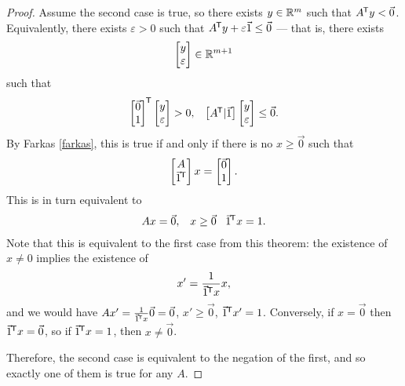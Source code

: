 \begin{proof}
    Assume the second case is true, so there exists $y \in \mathbb{R}^m$ such that ${A}^{\mkern-1.5mu\mathsf{T}}y < \vec{0}$. Equivalently, there exists $\varepsilon > 0$ such that ${A}^{\mkern-1.5mu\mathsf{T}}y + \varepsilon\vec{1} \leq \vec{0}$ --- that is, there exists
    \begin{align*}
        \begin{bmatrix}
            y \\ \varepsilon
        \end{bmatrix} \in \mathbb{R}^{m+1}
    \end{align*}
    such that
    \begin{align*}
        {\begin{bmatrix}
            \vec{0} \\ 1
        \end{bmatrix}}^{\mkern-1.5mu\mathsf{T}}
        \begin{bmatrix}
            y \\ \varepsilon
        \end{bmatrix} > 0,\;\;\;\begin{bmatrix}
            {A}^{\mkern-1.5mu\mathsf{T}} | \vec{1}
        \end{bmatrix}\begin{bmatrix}
            y \\ \varepsilon
        \end{bmatrix} \leq \vec{0}.
    \end{align*}
    By Farkas \ref{farkas}, this is true if and only if there is no $x \geq \vec{0}$ such that
    \begin{align*}
        \begin{bmatrix}
            A \\ {\vec{1}}^{\mkern-1.5mu\mathsf{T}}
        \end{bmatrix}x = \begin{bmatrix}
            \vec{0} \\ 1
        \end{bmatrix}.
    \end{align*}
    This is in turn equivalent to
    \begin{align*}
        Ax = \vec{0},\;\;\;x \geq \vec{0}\;\;\;{\vec{1}}^{\mkern-1.5mu\mathsf{T}}x = 1.
    \end{align*}
    Note that this is equivalent to the first case from this theorem: the existence of $x \neq 0$ implies the existence of
    \begin{align*}
        x' = \frac{1}{{\vec{1}}^{\mkern-1.5mu\mathsf{T}}x}x,
    \end{align*}
    and we would have $Ax' = \frac{1}{{\vec{1}}^{\mkern-1.5mu\mathsf{T}}x}\vec{0} = \vec{0}$, $x' \geq \vec{0}$, ${\vec{1}}^{\mkern-1.5mu\mathsf{T}}x' = 1$. Conversely, if $x = \vec{0}$ then ${\vec{1}}^{\mkern-1.5mu\mathsf{T}}x = \vec{0}$, so if ${\vec{1}}^{\mkern-1.5mu\mathsf{T}}x = 1$, then $x \neq \vec{0}$.

    Therefore, the second case is equivalent to the negation of the first, and so exactly one of them is true for any $A$.
\end{proof}

